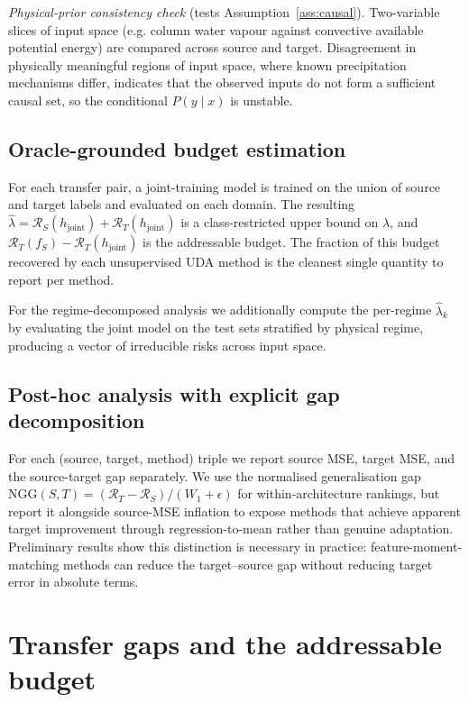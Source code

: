 \documentclass{article}
\begin{document}
\textit{Physical-prior consistency check} (tests
Assumption~\ref{ass:causal}). Two-variable slices of input space (e.g.
column water vapour against convective available potential energy) are
compared across source and target. Disagreement in physically
meaningful regions of input space, where known precipitation mechanisms
differ, indicates that the observed inputs do not form a sufficient
causal set, so the conditional $P(y\mid x)$ is unstable.

\subsection{Oracle-grounded budget estimation}

For each transfer pair, a joint-training model is trained on the union
of source and target labels and evaluated on each domain. The
resulting $\widehat{\lambda}=\mathcal{R}_S(h_{\text{joint}}) +
\mathcal{R}_T(h_{\text{joint}})$ is a class-restricted upper bound on
$\lambda$, and
$\mathcal{R}_T(f_S)-\mathcal{R}_T(h_{\text{joint}})$ is the addressable
budget. The fraction of this budget recovered by each unsupervised UDA
method is the cleanest single quantity to report per method.

For the regime-decomposed analysis we additionally compute the
per-regime $\widehat{\lambda}_k$ by evaluating the joint model on the
test sets stratified by physical regime, producing a vector of
irreducible risks across input space.

\subsection{Post-hoc analysis with explicit gap decomposition}

For each (source, target, method) triple we report source MSE, target
MSE, and the source-target gap separately. We use the normalised
generalisation gap $\mathrm{NGG}(S,T)=(\mathcal{R}_T-\mathcal{R}_S)
/(W_1+\epsilon)$ for within-architecture rankings, but report it
alongside source-MSE inflation to expose methods that achieve apparent
target improvement through regression-to-mean rather than genuine
adaptation. Preliminary results show this distinction is necessary in
practice: feature-moment-matching methods can reduce the
target--source gap without reducing target error in absolute terms.

\section{Transfer gaps and the addressable budget}\label{sec:budget}
\end{document}
